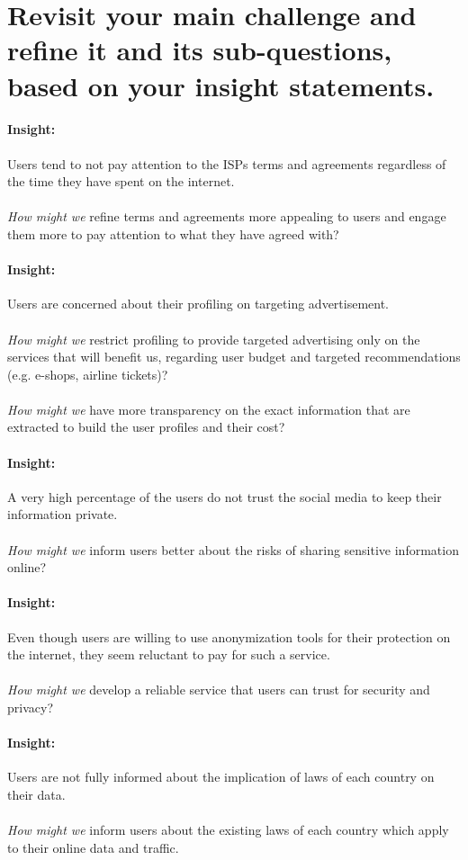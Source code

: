 \vspace{1cm}
\section{Revisit your main challenge and refine it and its sub-questions, based 
on your insight statements.}
\label{section_4}

\paragraph{Insight: } 
Users tend to not pay attention to the ISPs terms and agreements regardless of 
the time they have spent on the internet. \\
\\\emph{How might we } 
refine terms and agreements more appealing to users and engage them more to pay 
attention to what they have agreed with?

\paragraph{Insight: }
Users are concerned about their profiling on targeting advertisement. \\
\\\emph{How might we }
restrict profiling to provide targeted advertising only on the services that 
will benefit us, regarding user budget and targeted recommendations (e.g. 
e-shops, airline tickets)?\\
\\\emph{How might we }
have more transparency on the exact information that are extracted to build the 
user profiles and their cost?

\paragraph{Insight: }
A very high percentage of the users do not trust the social media to keep their 
information private.\\
\\\emph{How might we }
inform users better about the risks of sharing sensitive information online?

\paragraph{Insight: }
Even though users are willing to use anonymization tools for their protection on 
the internet, they seem reluctant to pay for such a service.\\
\\\emph{How might we }
develop a reliable service that users can trust for security and privacy?

\paragraph{Insight: }
Users are not fully informed about the implication of laws of each country on 
their data.\\
\\\emph{How might we }
inform users about the existing laws of each country which apply to their online 
data and traffic.

